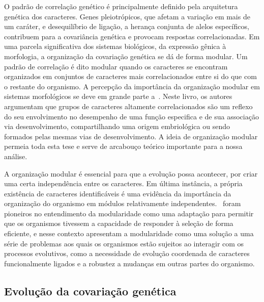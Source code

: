 \begin{refsection}
O padrão de correlação genético é principalmente definido pela arquitetura
genética dos caracteres. Genes pleiotrópicos, que afetam a variação em mais de
um caráter, e desequilíbrio de ligação, a herança conjunta de alelos
específicos, contribuem para a covariância genética e provocam respostas
correlacionadas. Em uma parcela significativa dos sistemas biológicos, da
expressão gênica à morfologia, a organização da covariação genética se dá de
forma modular. Um padrão de correlação é dito modular quando os caracteres se
encontram organizados em conjuntos de caracteres mais correlacionados entre si
do que com o restante do organismo. A percepção da importância da organização
modular em sistemas morfológicos se deve em grande parte
a~\textcite{Olson1958-qk}. Neste livro, os autores argumentam que 
grupos de caracteres altamente correlacionados são um reflexo do seu
envolvimento no desempenho de uma função especifica e de sua associação via
desenvolvimento, compartilhando uma origem embriológica ou sendo formados
pelas mesmas vias de desenvolvimento. A ideia de organização modular permeia
toda esta tese e serve de arcabouço teórico importante para a nossa
análise.

A organização modular é essencial para que a evolução possa acontecer, por
criar uma certa independência entre os caracteres. Em última instância, a
própria existência de caracteres identificáveis é uma evidência da
importância da organização do organismo em módulos relativamente
independentes.~\textcite{Wagner1996-ui} foram pioneiros no entendimento da
modularidade como uma adaptação para permitir que os organismos tivessem a
capacidade de responder à seleção de forma eficiente, e nesse contexto apresentam
a modularidade como uma solução a uma série de problemas aos quais os organismos estão
sujeitos ao interagir com os processos evolutivos, como a necessidade de
evolução coordenada de caracteres funcionalmente ligados e a robustez a
mudanças em outras partes do organismo.

\subsection{Evolução da covariação genética}


\end{refsection}
